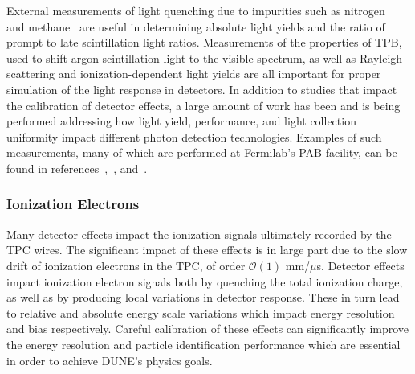 External measurements of light quenching due to impurities such as nitrogen~\cite{bib:scintillationN2} and methane~\cite{bib:scintillationCH4} are useful in determining absolute light yields and the ratio of prompt to late scintillation light ratios. Measurements of the properties of TPB,  used to shift argon scintillation light to the visible spectrum, as well as Rayleigh scattering and ionization-dependent light yields are all important for proper simulation of the light response in  detectors. In addition to studies that impact the calibration of detector effects, a large amount of work has been and is being performed addressing how light yield, performance, and light collection uniformity impact different photon detection %
technologies. Examples of such measurements, many of which are performed at Fermilab's PAB facility, can be found in references~\cite{bib:arapuca},~\cite{bib:attnlength}, and~\cite{bib:lightguide}.

\subsubsection{Ionization Electrons}
Many detector effects impact the ionization signals ultimately recorded by the TPC wires. The significant impact of these effects is in large part due to the slow drift of ionization electrons in the TPC, of order $\mathcal{O}(1)$ mm/$\mu$s. Detector effects impact ionization electron signals both by quenching the total ionization charge, as well as by producing local variations in detector response. These in turn lead to relative and absolute energy scale variations which impact energy resolution and bias respectively. Careful calibration of these effects can significantly improve the energy resolution and particle identification performance which are essential in order to achieve DUNE's physics goals.


